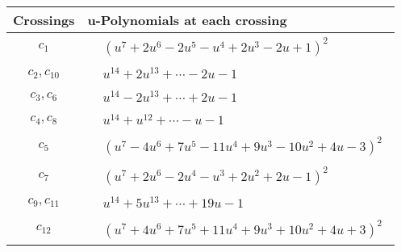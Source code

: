 \documentclass[1p]{elsarticle_modified}
\theoremstyle{definition}
\begin{document}
\begin{tabular}{m{50pt}|m{274pt}}
Crossings & \hspace{64pt}u-Polynomials at each crossing \\
\hline $$\begin{aligned}c_{1}\end{aligned}$$&$\begin{aligned}
&(u^7+2 u^6-2 u^5- u^4+2 u^3-2 u+1)^2
\end{aligned}$\\
\hline $$\begin{aligned}c_{2},c_{10}\end{aligned}$$&$\begin{aligned}
&u^{14}+2 u^{13}+\cdots-2 u-1
\end{aligned}$\\
\hline $$\begin{aligned}c_{3},c_{6}\end{aligned}$$&$\begin{aligned}
&u^{14}-2 u^{13}+\cdots+2 u-1
\end{aligned}$\\
\hline $$\begin{aligned}c_{4},c_{8}\end{aligned}$$&$\begin{aligned}
&u^{14}+u^{12}+\cdots- u-1
\end{aligned}$\\
\hline $$\begin{aligned}c_{5}\end{aligned}$$&$\begin{aligned}
&(u^7-4 u^6+7 u^5-11 u^4+9 u^3-10 u^2+4 u-3)^2
\end{aligned}$\\
\hline $$\begin{aligned}c_{7}\end{aligned}$$&$\begin{aligned}
&(u^7+2 u^6-2 u^4- u^3+2 u^2+2 u-1)^2
\end{aligned}$\\
\hline $$\begin{aligned}c_{9},c_{11}\end{aligned}$$&$\begin{aligned}
&u^{14}+5 u^{13}+\cdots+19 u-1
\end{aligned}$\\
\hline $$\begin{aligned}c_{12}\end{aligned}$$&$\begin{aligned}
&(u^7+4 u^6+7 u^5+11 u^4+9 u^3+10 u^2+4 u+3)^2
\end{aligned}$\\
\hline
\end{tabular}\\~\\
\end{document}

